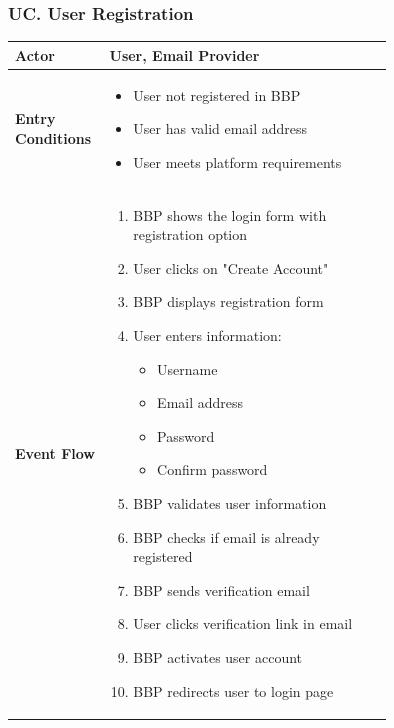 \setcounter{table}{0}

\subsubsection*{UC\cuc . User Registration}
\begin{center}
    \begin{longtable}{|l|p{0.75\linewidth}|}
        \hline
        \textbf{Actor}            & User, Email Provider \\
        \hline
        \textbf{Entry Conditions} & 
        \begin{itemize}
            \item User not registered in BBP
            \item User has valid email address
            \item User meets platform requirements
        \end{itemize} \\
        \hline
        \textbf{Event Flow}       & 
        \begin{enumerate}
            \item BBP shows the login form with registration option
            \item User clicks on "Create Account"
            \item BBP displays registration form
            \item User enters information:
            \begin{itemize}
                \item Username
                \item Email address
                \item Password
                \item Confirm password
            \end{itemize}
            \item BBP validates user information
            \item BBP checks if email is already registered
            \item BBP sends verification email
            \item User clicks verification link in email
            \item BBP activates user account
            \item BBP redirects user to login page
        \end{enumerate} \\

\end{longtable}
\end{center}
